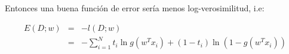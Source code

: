 \documentclass[a4paper]{article}
\begin{document}
\begin{enumerate}
{       Entonces una buena función de error sería menos log-verosimilitud, i.e:

       \begin{eqnarray*}
        E(D; w) &=& -l(D; w) \\
        &=&
        -\sum_{i = 1}^{N}
        t_i\ln g(w^Tx_i) + (1-t_i)\ln(1-g(w^Tx_i))
       \end{eqnarray*}






}
\end{enumerate}
\end{document}
